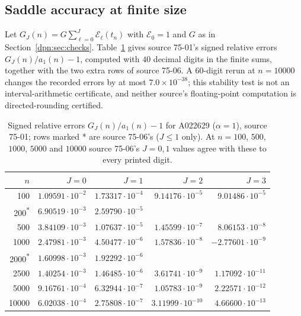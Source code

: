 \documentclass[11pt]{article}
\numberwithin{equation}{section}
\theoremstyle{definition}\newtheorem{definition}[theorem]{Definition}
\theoremstyle{remark}\newtheorem{remark}[theorem]{Remark}
\begin{document}
\subsection{Saddle accuracy at finite size}\label{dpn:jh:sec:numerics}
Let $G_J(n)=G\sum_{\ell=0}^J\mathcal E_\ell(t_n)$ with $\mathcal E_0=1$ and
$G$ as in Section~\ref{dpn:sec:checks}.  Table~\ref{dpn:jh:tab:errors} gives
source 75-01's signed relative errors $G_J(n)/a_1(n)-1$, computed with $40$
decimal digits in the finite sums, together with the two extra rows of source
75-06.  A $60$-digit rerun at $n=10000$ changes the recorded errors by at most
$7.0\times10^{-38}$; this stability test is not an interval-arithmetic
certificate, and neither source's floating-point computation is
directed-rounding certified.
\begin{table}[!htbp]
\centering\small
\begin{tabular}{rrrrr}
\toprule
$n$ & $J=0$ & $J=1$ & $J=2$ & $J=3$\\
\midrule
100   & $1.09591\cdot10^{-2}$ & $1.73317\cdot10^{-4}$ & $9.14176\cdot10^{-5}$ & $9.01486\cdot10^{-5}$\\
200\textsuperscript{*}  & $6.90519\cdot10^{-3}$ & $2.59790\cdot10^{-5}$ & & \\
500   & $3.84109\cdot10^{-3}$ & $1.07637\cdot10^{-5}$ & $1.45599\cdot10^{-7}$ & $8.06153\cdot10^{-8}$\\
1000  & $2.47981\cdot10^{-3}$ & $4.50477\cdot10^{-6}$ & $1.57836\cdot10^{-8}$ & $-2.77601\cdot10^{-9}$\\
2000\textsuperscript{*} & $1.60998\cdot10^{-3}$ & $1.92292\cdot10^{-6}$ & & \\
2500  & $1.40254\cdot10^{-3}$ & $1.46485\cdot10^{-6}$ & $3.61741\cdot10^{-9}$ & $1.17092\cdot10^{-11}$\\
5000  & $9.16761\cdot10^{-4}$ & $6.32944\cdot10^{-7}$ & $1.05783\cdot10^{-9}$ & $2.22571\cdot10^{-12}$\\
10000 & $6.02038\cdot10^{-4}$ & $2.75808\cdot10^{-7}$ & $3.11999\cdot10^{-10}$ & $4.66600\cdot10^{-13}$\\
\bottomrule
\end{tabular}
\caption{Signed relative errors $G_J(n)/a_1(n)-1$ for A022629 ($\alpha=1$),
source 75-01; rows marked * are source 75-06's ($J\le1$ only).  At $n=100$, $500$,
$1000$, $5000$ and $10000$ source 75-06's $J=0,1$ values agree with these to
every printed digit.}
\label{dpn:jh:tab:errors}
\end{table}
\end{document}
